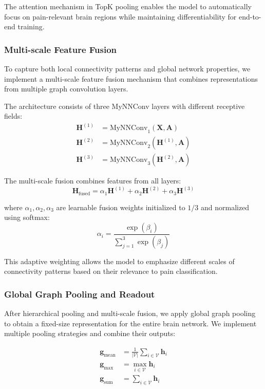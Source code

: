 \documentclass[10pt,journal,compsoc]{IEEEtran}
\begin{document}
The attention mechanism in TopK pooling enables the model to automatically focus on pain-relevant brain regions while maintaining differentiability for end-to-end training.

\subsubsection{Multi-scale Feature Fusion}

To capture both local connectivity patterns and global network properties, we implement a multi-scale feature fusion mechanism that combines representations from multiple graph convolution layers.

The architecture consists of three MyNNConv layers with different receptive fields:
\begin{align}
\mathbf{H}^{(1)} &= \text{MyNNConv}_1(\mathbf{X}, \mathbf{A}) \\
\mathbf{H}^{(2)} &= \text{MyNNConv}_2(\mathbf{H}^{(1)}, \mathbf{A}) \\
\mathbf{H}^{(3)} &= \text{MyNNConv}_3(\mathbf{H}^{(2)}, \mathbf{A})
\end{align}

The multi-scale fusion combines features from all layers:
\begin{equation}
\mathbf{H}_{\text{fused}} = \alpha_1 \mathbf{H}^{(1)} + \alpha_2 \mathbf{H}^{(2)} + \alpha_3 \mathbf{H}^{(3)}
\end{equation}

where $\alpha_1, \alpha_2, \alpha_3$ are learnable fusion weights initialized to $1/3$ and normalized using softmax:
\begin{equation}
\alpha_i = \frac{\exp(\beta_i)}{\sum_{j=1}^3 \exp(\beta_j)}
\end{equation}

This adaptive weighting allows the model to emphasize different scales of connectivity patterns based on their relevance to pain classification.

\subsubsection{Global Graph Pooling and Readout}

After hierarchical pooling and multi-scale fusion, we apply global graph pooling to obtain a fixed-size representation for the entire brain network. We implement multiple pooling strategies and combine their outputs:

\begin{align}
\mathbf{g}_{\text{mean}} &= \frac{1}{|\mathcal{V}|} \sum_{i \in \mathcal{V}} \mathbf{h}_i \\
\mathbf{g}_{\text{max}} &= \max_{i \in \mathcal{V}} \mathbf{h}_i \\
\mathbf{g}_{\text{sum}} &= \sum_{i \in \mathcal{V}} \mathbf{h}_i
\end{align}
\end{document}
